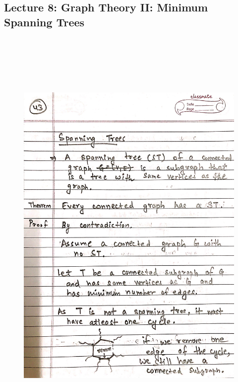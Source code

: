 \newpage
{\color{black} \subsection*{Lecture 8: Graph Theory II: Minimum Spanning Trees}}
\begin{figure}[H]
    \centering
    \includegraphics[width=16cm, height=21cm]{"./MIT-6.042J/MIT-6042J-043"}
\end{figure}

